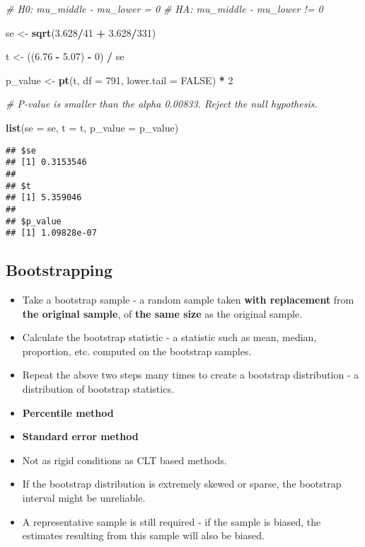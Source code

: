 \documentclass[]{book}
\newenvironment{Shaded}{\begin{snugshade}}{\end{snugshade}}
\newcommand{\CommentTok}[1]{\textcolor[rgb]{0.56,0.35,0.01}{\textit{#1}}}
\newcommand{\DataTypeTok}[1]{\textcolor[rgb]{0.13,0.29,0.53}{#1}}
\newcommand{\DecValTok}[1]{\textcolor[rgb]{0.00,0.00,0.81}{#1}}
\newcommand{\FloatTok}[1]{\textcolor[rgb]{0.00,0.00,0.81}{#1}}
\newcommand{\KeywordTok}[1]{\textcolor[rgb]{0.13,0.29,0.53}{\textbf{#1}}}
\newcommand{\NormalTok}[1]{#1}
\newcommand{\OperatorTok}[1]{\textcolor[rgb]{0.81,0.36,0.00}{\textbf{#1}}}
\newcommand{\OtherTok}[1]{\textcolor[rgb]{0.56,0.35,0.01}{#1}}
\newcommand{\StringTok}[1]{\textcolor[rgb]{0.31,0.60,0.02}{#1}}
\begin{document}
\begin{Shaded}
\begin{Highlighting}[]
\CommentTok{# H0: mu_middle - mu_lower = 0}
\CommentTok{# HA: mu_middle - mu_lower != 0}

\NormalTok{se <-}\StringTok{ }\KeywordTok{sqrt}\NormalTok{(}\FloatTok{3.628}\OperatorTok{/}\DecValTok{41} \OperatorTok{+}\StringTok{ }\FloatTok{3.628}\OperatorTok{/}\DecValTok{331}\NormalTok{)}

\NormalTok{t <-}\StringTok{ }\NormalTok{((}\FloatTok{6.76} \OperatorTok{-}\StringTok{ }\FloatTok{5.07}\NormalTok{) }\OperatorTok{-}\StringTok{ }\DecValTok{0}\NormalTok{) }\OperatorTok{/}\StringTok{ }\NormalTok{se}

\NormalTok{p_value <-}\StringTok{ }\KeywordTok{pt}\NormalTok{(t, }\DataTypeTok{df =} \DecValTok{791}\NormalTok{, }\DataTypeTok{lower.tail =} \OtherTok{FALSE}\NormalTok{) }\OperatorTok{*}\StringTok{ }\DecValTok{2}

\CommentTok{# P-value is smaller than the alpha 0.00833. Reject the null hypothesis.}

\KeywordTok{list}\NormalTok{(}\DataTypeTok{se =}\NormalTok{ se, }\DataTypeTok{t =}\NormalTok{ t, }\DataTypeTok{p_value =}\NormalTok{ p_value)}
\end{Highlighting}
\end{Shaded}

\begin{verbatim}
## $se
## [1] 0.3153546
## 
## $t
## [1] 5.359046
## 
## $p_value
## [1] 1.09828e-07
\end{verbatim}

\hypertarget{bootstrapping}{%
\subsection*{Bootstrapping}\label{bootstrapping}}

\begin{itemize}
\item
  Take a bootstrap sample - a random sample taken \textbf{with replacement} from \textbf{the original sample}, of \textbf{the same size} as the original sample.
\item
  Calculate the bootstrap statistic - a statistic such as mean, median, proportion, etc. computed on the bootstrap samples.
\item
  Repeat the above two steps many times to create a bootstrap distribution - a distribution of bootstrap statistics.
\item
  \textbf{Percentile method}
\item
  \textbf{Standard error method}
\item
  Not as rigid conditions as CLT based methods.
\item
  If the bootstrap distribution is extremely skewed or sparse, the bootstrap interval might be unreliable.
\item
  A representative sample is still required - if the sample is biased, the estimates resulting from this sample will also be biased.
\end{itemize}
\end{document}
